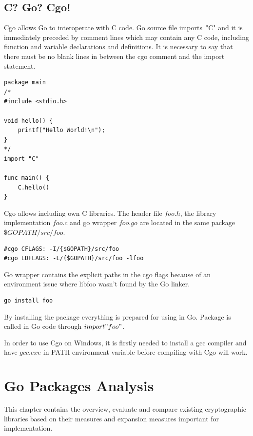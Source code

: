 \documentclass[
  digital, %
  notable,   %
  lof,     %
  lot,     %
]{fithesis3}
\begin{document}
\section{C? Go? Cgo!}\label{cgo}
Cgo allows Go to interoperate with C code. Go source file imports~"C" and it is immediately 
preceded by comment lines which may contain any C code, including function and variable 
declarations and definitions. It is necessary to say that there must be no blank lines in 
between the cgo comment and the import statement. 

\begin{lstlisting}
package main
/*
#include <stdio.h>

void hello() {
	printf("Hello World!\n");
}
*/
import "C"

func main() {
	C.hello()
}
\end{lstlisting}

Cgo allows including own C libraries. The header file $foo.h$, the library implementation 
$foo.c$ and go wrapper $foo.go$ are located in the same package $\$GOPATH/src/foo$. 
\begin{lstlisting}
#cgo CFLAGS: -I/{$GOPATH}/src/foo
#cgo LDFLAGS: -L/{$GOPATH}/src/foo -lfoo
\end{lstlisting}
Go wrapper contains the explicit paths in the cgo flags because of an environment issue where 
libfoo wasn’t found by the Go linker.
\begin{lstlisting} 
go install foo 
\end{lstlisting}
By installing the package everything is prepared for using in Go. Package is called in Go code 
through $import "foo"$.

In order to use Cgo on Windows, it is firstly needed to install a gcc compiler and have 
$gcc.exe$ in PATH environment variable before compiling with Cgo will work.

\nocite{cgo-command}
\nocite{bloggolangorg}
\nocite{cgo-wiki}

\nocite{chisnall2012go}
\nocite{balbaert_2012}
\nocite{summerfield_2012}
\nocite{harris_2015}
\nocite{kozyra_2014}

\chapter{Go Packages Analysis} %
This chapter contains the overview, evaluate and compare existing cryptographic libraries based on 
their measures and expansion measures important for implementation.
\end{document}
